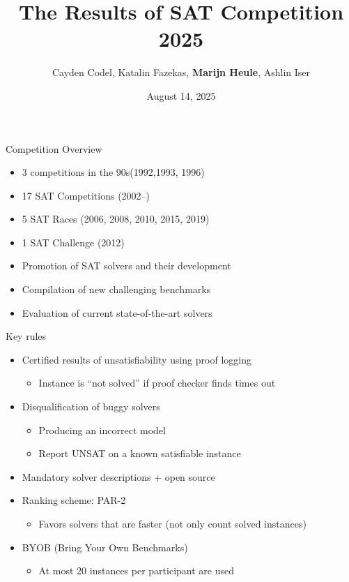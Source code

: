 \documentclass{beamer}
\title[SAT Competition 2023]{{\bf The Results of SAT Competition 2025}%
}
\author[Codel, Fazekas, Heule, Iser] {Cayden Codel, Katalin Fazekas, {\bf Marijn Heule},
{Ashlin Iser}}
\institute[] %
{\Large 
SAT 2025 Conference, Glasgow, Scotland \\ %
}
\date{August 14, 2025} %
\begin{document}
\begin{frame}
\titlepage %
\end{frame}

\begin{frame}{Competition Overview}

\begin{itemize}
\item 3 competitions in the 90s\hfill (1992,1993, 1996)
\item 17 SAT Competitions \hfill (2002--)
\item 5 SAT Races \hfill (2006, 2008, 2010, 2015, 2019)
\item 1 SAT Challenge \hfill (2012)
\end{itemize}

\bigskip
\bigskip

\begin{itemize}
\item Promotion of SAT solvers and their development
\item Compilation of new challenging benchmarks
\item Evaluation of current state-of-the-art solvers
\end{itemize}

\end{frame}


\begin{frame}{Key rules}
\begin{itemize}
\item Certified results of unsatisfiability using proof logging
  \begin{itemize}
  \item Instance is ``not solved'' if proof checker finds times out
  \end{itemize}
\medskip
\item Disqualification of buggy solvers
  \begin{itemize}
  \item Producing an incorrect model
  \item Report UNSAT on a known satisfiable instance
  \end{itemize}
\medskip
\item Mandatory solver descriptions + open source
\medskip
\item Ranking scheme: PAR-2
\begin{itemize}
\item Favors solvers that are faster (not only count solved instances)
\end{itemize}
\medskip
\item BYOB (Bring Your Own Benchmarks)
\begin{itemize}
\item At most 20 instances per participant are used
\end{itemize} 
\end{itemize}
\end{frame}
\end{document}
